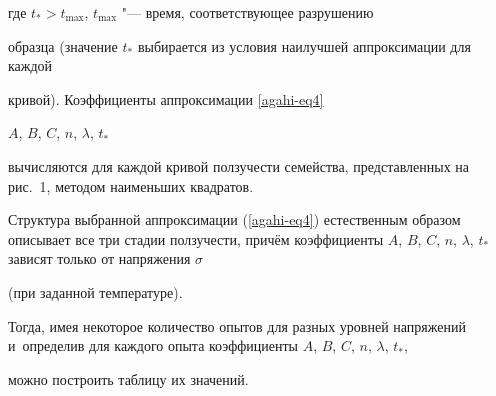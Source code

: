 где $t_\ast >t_{\max } $, $t_{\max } $ "--- время, соответствующее разрушению

образца (значение $t_\ast $ выбирается из условия наилучшей аппроксимации для каждой

кривой). Коэффициенты  аппроксимации \eqref{agahi-eq4}

$A$, $B$, $C$, $n$, $\lambda$, $t_\ast$

вычисляются для каждой кривой ползучести семейства, представленных на рис.~1, методом наименьших квадратов.



Структура выбранной аппроксимации (\ref{agahi-eq4}) естественным образом описывает все три стадии ползучести, причём коэффициенты $A$, $B$, $C$, $n$, $\lambda$, $t_\ast $зависят только от напряжения $\sigma $

(при заданной температуре).

Тогда, имея некоторое количество опытов для разных уровней напряжений и~определив для каждого опыта коэффициенты $A$, $B$, $C$, $n$, $\lambda$, $t_\ast$,

можно построить таблицу их значений.











